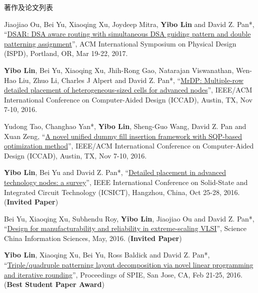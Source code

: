 \begin{rSection}{著作及论文列表}
\begin{description}[font=\normalfont, rightmargin=2em]
{}
            

\item[{[C11]}]{
        Jiaojiao Ou, Bei Yu, Xiaoqing Xu, Joydeep Mitra, \textbf{Yibo Lin} and David Z. Pan*, 
    ``\href{https://doi.org/10.1145/3036669.3036677}{DSAR: DSA aware routing with simultaneous DSA guiding pattern and double patterning assignment}'', 
    ACM International Symposium on Physical Design (ISPD), Portland, OR, Mar 19-22, 2017.
    
}
            

\item[{[C10]}]{
        \textbf{Yibo Lin}, Bei Yu, Xiaoqing Xu, Jhih-Rong Gao, Natarajan Viswanathan, Wen-Hao Liu, Zhuo Li, Charles J Alpert and David Z. Pan*, 
    ``\href{http://dx.doi.org/10.1145/2966986.2967055}{MrDP: Multiple-row detailed placement of heterogeneous-sized cells for advanced nodes}'', 
    IEEE/ACM International Conference on Computer-Aided Design (ICCAD), Austin, TX, Nov 7-10, 2016.
    
}
            

\item[{[C9]}]{
        Yudong Tao, Changhao Yan*, \textbf{Yibo Lin}, Sheng-Guo Wang, David Z. Pan and Xuan Zeng, 
    ``\href{http://dx.doi.org/10.1145/2966986.2966994}{A novel unified dummy fill insertion framework with SQP-based optimization method}'', 
    IEEE/ACM International Conference on Computer-Aided Design (ICCAD), Austin, TX, Nov 7-10, 2016.
    
}
            

\item[{[C8]}]{
        \textbf{Yibo Lin}, Bei Yu and David Z. Pan*, 
    ``\href{https://doi.org/10.1109/ICSICT.2016.7999056}{Detailed placement in advanced technology nodes: a survey}'', 
    IEEE International Conference on Solid-State and Integrated Circuit Technology (ICSICT), Hangzhou, China, Oct 25-28, 2016.
    (\textbf{Invited Paper})
}
            

\item[{[J7]}]{
        Bei Yu, Xiaoqing Xu, Subhendu Roy, \textbf{Yibo Lin}, Jiaojiao Ou and David Z. Pan*, 
    ``\href{http://link.springer.com/article/10.1007%2Fs11432-016-5560-6}{Design for manufacturability and reliability in extreme-scaling {VLSI}}'', 
    Science China Information Sciences, May, 2016.
    (\textbf{Invited Paper})
}
            

\item[{[C6]}]{
        \textbf{Yibo Lin}, Xiaoqing Xu, Bei Yu, Ross Baldick and David Z. Pan*, 
    ``\href{http://dx.doi.org/10.1117/12.2218628}{Triple/quadruple patterning layout decomposition via novel linear programming and iterative rounding}'', 
    Proceedings of SPIE, San Jose, CA, Feb 21-25, 2016.
    (\textbf{Best Student Paper Award})
}
            


\end{description}
\end{rSection}
